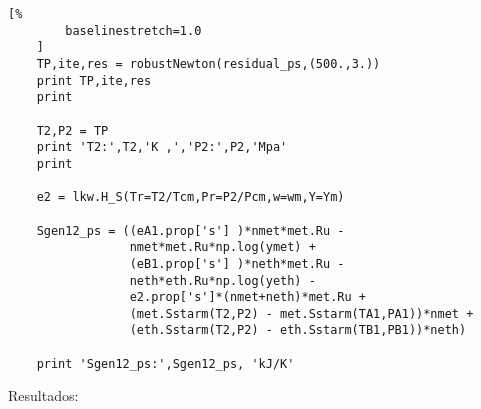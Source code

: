 \begin{Verbatim}[%
        baselinestretch=1.0
    ]
    TP,ite,res = robustNewton(residual_ps,(500.,3.))
    print TP,ite,res
    print

    T2,P2 = TP
    print 'T2:',T2,'K ,','P2:',P2,'Mpa'
    print

    e2 = lkw.H_S(Tr=T2/Tcm,Pr=P2/Pcm,w=wm,Y=Ym)

    Sgen12_ps = ((eA1.prop['s'] )*nmet*met.Ru -
                 nmet*met.Ru*np.log(ymet) +
                 (eB1.prop['s'] )*neth*met.Ru -
                 neth*eth.Ru*np.log(yeth) -
                 e2.prop['s']*(nmet+neth)*met.Ru +
                 (met.Sstarm(T2,P2) - met.Sstarm(TA1,PA1))*nmet +
                 (eth.Sstarm(T2,P2) - eth.Sstarm(TB1,PB1))*neth)

    print 'Sgen12_ps:',Sgen12_ps, 'kJ/K'
    \end{Verbatim}

    Resultados:

